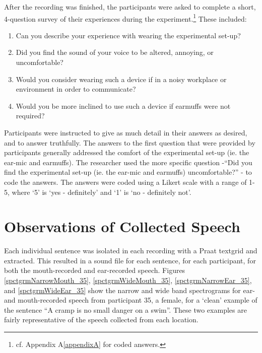 After the recording was finished, the participants were asked to complete a short, 4-question survey of their experiences during the experiment.\footnote{cf. Appendix A\ref{appendixA} for coded answers.}  These included:
\begin{enumerate}
  \item{Can you describe your experience with wearing the experimental set-up?}
  \item{Did you find the sound of your voice to be altered, annoying, or uncomfortable?}
  \item{Would you consider wearing such a device if in a noisy workplace or environment in order to communicate?}
  \item{Would you be more inclined to use such a device if earmuffs were not required?}
\end{enumerate}

Participants were instructed to give as much detail in their answers as desired, and to answer truthfully.  The answers to the first question that were provided by participants generally addressed the comfort of the experimental set-up (ie. the ear-mic and earmuffs).  The researcher used the more specific question -``Did you find the experimental set-up (ie. the ear-mic and earmuffs) uncomfortable?'' - to code the answers. The answers were coded using a Likert scale with a range of 1-5, where `5' is `yes - definitely' and `1' is `no - definitely not'.


\section{Observations of Collected Speech}\label{chap2:observations}

Each individual sentence was isolated in each recording with a Praat textgrid and extracted.  This resulted in a sound file for each sentence, for each participant, for both the mouth-recorded and ear-recorded speech.  Figures \ref{spctgrmNarrowMouth_35}, \ref{spctgrmWideMouth_35}, \ref{spctgrmNarrowEar_35}, and \ref{spctgrmWideEar_35} show the narrow and wide band spectrograms for ear- and mouth-recorded speech from participant 35, a female, for a `clean' example of the sentence ``A cramp is no small danger on a swim''.  These two examples are fairly representative of the speech collected from each location.


